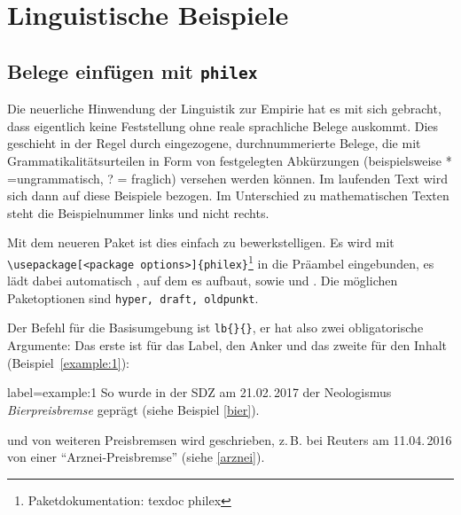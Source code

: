 
%

%

\section{Linguistische Beispiele}

\subsection{Belege einfügen mit \texttt{philex}}
\label{belege} 
\author{Christine Römer}

Die neuerliche Hinwendung der Linguistik zur Empirie hat es mit sich gebracht, dass eigentlich keine Feststellung ohne reale sprachliche Belege
auskommt. Dies geschieht in der Regel durch eingezogene, durchnummerierte Belege, die mit Grammatikalitätsurteilen in Form von festgelegten Abkürzungen (beispielsweise * =ungrammatisch, ? = fraglich) versehen werden können.
Im laufenden Text wird sich dann auf diese Beispiele bezogen. Im Unterschied zu mathematischen Texten steht die Beispielnummer links und nicht rechts.

Mit dem neueren Paket  ist dies einfach zu bewerkstelligen.
Es wird mit \verb|\usepackage[<package options>]{philex}|\footnote{Paketdokumentation: texdoc philex} in die Präambel eingebunden, es lädt dabei automatisch , auf dem es aufbaut, sowie  und . Die möglichen Paketoptionen sind \texttt{hyper, draft, oldpunkt}.

Der Befehl für die Basisumgebung ist  \verb|lb{}{}|, er hat also
zwei obligatorische Argumente: Das erste ist für das Label, den Anker und das zweite für den Inhalt (Beispiel~\ref{example:1}):

\begin{lfgwexample}{label={example:1}}
So wurde in der SDZ am 21.02.\,2017 der Neologismus \emph{Bierpreisbremse} geprägt (siehe Beispiel \ref{bier}).


und von weiteren Preisbremsen wird geschrieben, z.\,B. bei Reuters am 11.04.\,2016 von einer \enquote{Arznei-Preisbremse} (siehe \ref{arznei}).


\end{lfgwexample}

